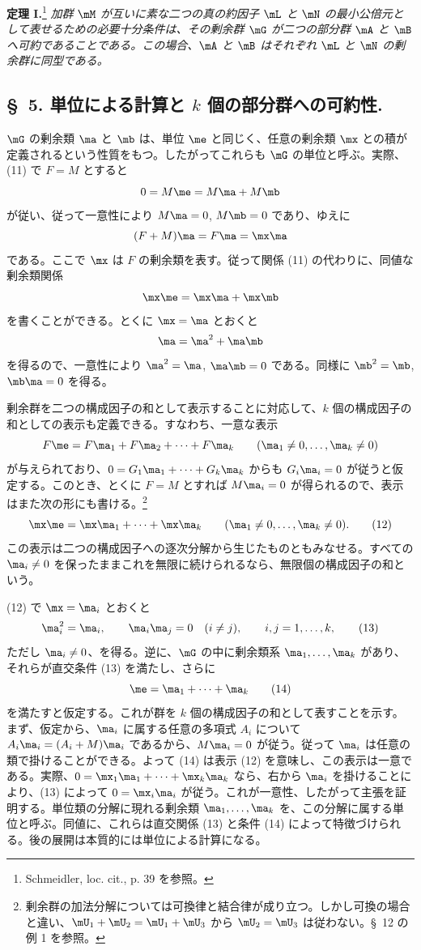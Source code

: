 \documentclass[11pt]{article}
\begin{document}
\textbf{定理 I.}\footnote{Schmeidler, loc. cit., p. 39 を参照。} \emph{加群 $\mM$ が互いに素な二つの真の約因子 $\mL$ と $\mN$ の最小公倍元として表せるための必要十分条件は、その剰余群 $\mG$ が二つの部分群 $\mA$ と $\mB$ へ可約であることである。この場合、$\mA$ と $\mB$ はそれぞれ $\mL$ と $\mN$ の剰余群に同型である。}

\subsection*{\S~5. 単位による計算と $k$ 個の部分群への可約性.}

$\mG$ の剰余類 $\ma$ と $\mb$ は、単位 $\me$ と同じく、任意の剰余類 $\mx$ との積が定義されるという性質をもつ。したがってこれらも $\mG$ の単位と呼ぶ。実際、(11) で $F=M$ とすると
\[
 0=M\me=M\ma+M\mb
\]
が従い、従って一意性により $M\ma=0$, $M\mb=0$ であり、ゆえに
\[
 (F+M)\ma=F\ma=\mx\ma
\]
である。ここで $\mx$ は $F$ の剰余類を表す。従って関係 (11) の代わりに、同値な剰余類関係
\[
 \mx\me=\mx\ma+\mx\mb
\]
を書くことができる。とくに $\mx=\ma$ とおくと
\[
 \ma=\ma^2+\ma\mb
\]
を得るので、一意性により $\ma^2=\ma$, $\ma\mb=0$ である。同様に $\mb^2=\mb$, $\mb\ma=0$ を得る。

剰余群を二つの構成因子の和として表示することに対応して、$k$ 個の構成因子の和としての表示も定義できる。すなわち、一意な表示
\[
 F\me=F\ma_1+F\ma_2+\cdots+F\ma_k\qquad(\ma_1\ne0,\ldots,\ma_k\ne0)
\]
が与えられており、$0=G_1\ma_1+\cdots+G_k\ma_k$ からも $G_i\ma_i=0$ が従うと仮定する。このとき、とくに $F=M$ とすれば $M\ma_i=0$ が得られるので、表示はまた次の形にも書ける。\footnote{剰余群の加法分解については可換律と結合律が成り立つ。しかし可換の場合と違い、$\mU_1+\mU_2=\mU_1+\mU_3$ から $\mU_2=\mU_3$ は従わない。\S~12 の例 1 を参照。}
\begin{equation}
 \mx\me=\mx\ma_1+\cdots+\mx\ma_k\qquad(\ma_1\ne0,\ldots,\ma_k\ne0).
\tag{12}
\end{equation}
この表示は二つの構成因子への逐次分解から生じたものともみなせる。すべての $\ma_i\ne0$ を保ったままこれを無限に続けられるなら、無限個の構成因子の和という。

(12) で $\mx=\ma_i$ とおくと
\begin{equation}
 \ma_i^2=\ma_i,
 \qquad \ma_i\ma_j=0\quad(i\ne j),
 \qquad i,j=1,\ldots,k,
\tag{13}
\end{equation}
ただし $\ma_i\ne0$、を得る。逆に、$\mG$ の中に剰余類系 $\ma_1,\ldots,\ma_k$ があり、それらが直交条件 (13) を満たし、さらに
\begin{equation}
 \me=\ma_1+\cdots+\ma_k
\tag{14}
\end{equation}
を満たすと仮定する。これが群を $k$ 個の構成因子の和として表すことを示す。まず、仮定から、$\ma_i$ に属する任意の多項式 $A_i$ について $A_i\ma_i=(A_i+M)\ma_i$ であるから、$M\ma_i=0$ が従う。従って $\ma_i$ は任意の類で掛けることができる。よって (14) は表示 (12) を意味し、この表示は一意である。実際、$0=\mx_1\ma_1+\cdots+\mx_k\ma_k$ なら、右から $\ma_i$ を掛けることにより、(13) によって $0=\mx_i\ma_i$ が従う。これが一意性、したがって主張を証明する。単位類の分解に現れる剰余類 $\ma_1,
\ldots,\ma_k$ を、この分解に属する単位と呼ぶ。同値に、これらは直交関係 (13) と条件 (14) によって特徴づけられる。後の展開は本質的には単位による計算になる。
\end{document}
